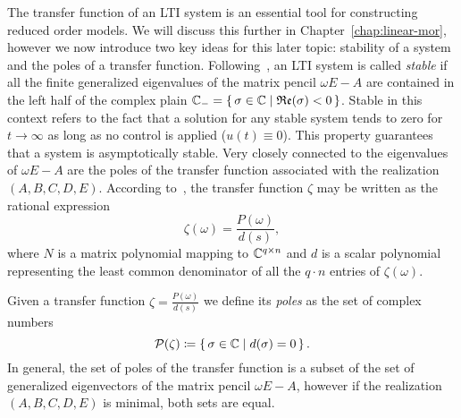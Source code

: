 The transfer function of an LTI system is an essential tool for constructing reduced order models.
We will discuss this further in Chapter~\ref{chap:linear-mor}, however we now introduce two key ideas for this later topic: stability of a system and the poles of a transfer function.
Following~\cite{Benner2017}, an LTI system is called \emph{stable} if all the finite generalized eigenvalues of the matrix pencil $\omega E - A$ are contained in the left half of the complex plain $\mathbb{C}_{-} = \left\{\,\sigma \in \mathbb{C}\mid\mathfrak{Re}(\sigma) < 0\,\right\}$.
Stable in this context refers to the fact that a solution for any stable system tends to zero for $t \rightarrow \infty$ as long as no control is applied ($u(t) \equiv 0$).
This property guarantees that a system is asymptotically stable.
Very closely connected to the eigenvalues of $\omega E - A$ are the poles of the transfer function associated with the realization $(A, B, C, D, E)$.
According to~\cite[Section~2]{Benner2017}, the transfer function $\zeta$ may be written as the rational expression
\begin{equation*}
    \zeta(\omega) = \frac{P(\omega)}{d(s)},
\end{equation*}
where $N$ is a matrix polynomial mapping to $\mathbb{C}^{q \times n}$ and $d$ is a scalar polynomial representing the least common denominator of all the $q \cdot n$ entries of $\zeta(\omega)$.

\begin{definition}\label{def:transfer-function-poles}
    Given a transfer function $\zeta = \frac{P(\omega)}{d(s)}$ we define its \emph{poles} as the set of complex numbers
    \begin{equation*}
        \mathcal{P}(\zeta) \coloneqq \left\{\,\sigma \in \mathbb{C}\mid d(\sigma) = 0\,\right\}.
    \end{equation*}
    In general, the set of poles of the transfer function is a subset of the set of generalized eigenvectors of the matrix pencil $\omega E - A$, however if the realization $(A, B, C, D, E)$ is minimal, both sets are equal.
\end{definition}
